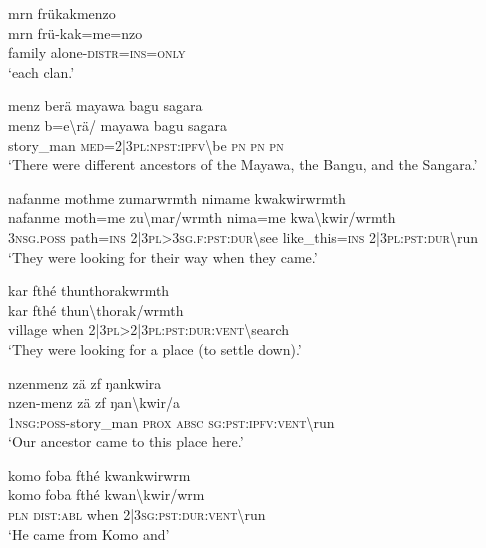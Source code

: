 \ea\label{ex:2:a1615}
mrn frükakmenzo\\
\gll mrn	frü-kak=me=nzo\\
     family	alone-\textsc{distr}=\textsc{ins}=\textsc{only}\\
\glt `each clan.'
\z

\ea\label{ex:2:a1616}
menz berä mayawa bagu sagara\\
\gll menz	b=e{\textbackslash}rä/	mayawa	bagu	sagara\\
     story\_man	\textsc{med}=2|3\textsc{pl}:\textsc{npst}:\textsc{ipfv}{\textbackslash}be	\textsc{pn}	\textsc{pn}	\textsc{pn}\\
\glt `There were different ancestors of the Mayawa, the Bangu, and the Sangara.'
\z

\ea\label{ex:2:a1619}
nafanme mothme zumarwrmth nimame kwakwirwrmth\\
\gll nafanme	moth=me	zu{\textbackslash}mar/wrmth	nima=me	kwa{\textbackslash}kwir/wrmth\\
     3\textsc{nsg}.\textsc{poss}	path=\textsc{ins}	2|3\textsc{pl}>3\textsc{sg}.\textsc{f}:\textsc{pst}:\textsc{dur}{\textbackslash}see	like\_this=\textsc{ins}	2|3\textsc{pl}:\textsc{pst}:\textsc{dur}{\textbackslash}run\\
\glt `They were looking for their way when they came.'
\z

\ea\label{ex:2:a1620}
kar fthé thunthorakwrmth\\
\gll kar	fthé	thun{\textbackslash}thorak/wrmth\\
     village	when	2|3\textsc{pl}>2|3\textsc{pl}:\textsc{pst}:\textsc{dur}:\textsc{vent}{\textbackslash}search\\
\glt `They were looking for a place (to settle down).'
\z

\ea\label{ex:2:a1621}
nzenmenz zä zf ŋankwira\\
\gll nzen-menz	zä	zf	ŋan{\textbackslash}kwir/a\\
     1\textsc{nsg}:\textsc{poss}-story\_man	\textsc{prox}	\textsc{absc}	\textsc{sg}:\textsc{pst}:\textsc{ipfv}:\textsc{vent}{\textbackslash}run\\
\glt `Our ancestor came to this place here.'
\z

\ea\label{ex:2:a1622}
komo foba fthé kwankwirwrm\\
\gll komo	foba	fthé	kwan{\textbackslash}kwir/wrm\\
     \textsc{pln}	\textsc{dist}:\textsc{abl}	when	2|3\textsc{sg}:\textsc{pst}:\textsc{dur}:\textsc{vent}{\textbackslash}run\\
\glt `He came from Komo and'
\z

